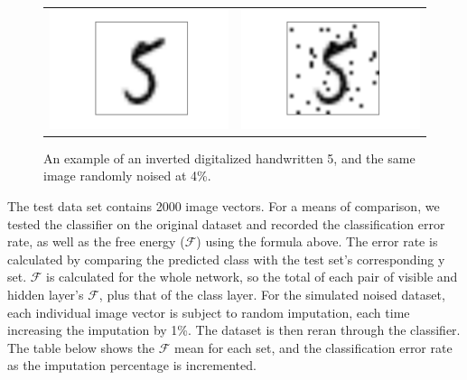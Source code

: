 \documentclass{report}
\begin{document}
\begin{figure}[h!]
	\begin{tabular}{c c}
	\includegraphics[width=.45\textwidth]{test_digit} & \includegraphics[width=.45\textwidth]{imp_test_digit}
	\end{tabular}
	\caption{An example of an inverted digitalized handwritten 5, and the same image randomly noised at 4\%.}
\end{figure}



The test data set contains 2000 image vectors. For a means of comparison, we tested the classifier on the original dataset and recorded the classification error rate, as well as the free energy ($\mathcal{F}$) using the formula above. The error rate is calculated by comparing the predicted class with the test set's corresponding y set. $\mathcal{F}$ is calculated for the whole network, so the total of each pair of visible and hidden layer's $\mathcal{F}$, plus that of the class layer. For the simulated noised dataset, each individual image vector is subject to random imputation, each time increasing the imputation by 1\%. The dataset is then reran through the classifier.  The table below shows the $\mathcal{F}$ mean for each set, and the classification error rate as the imputation percentage is incremented.
\end{document}
